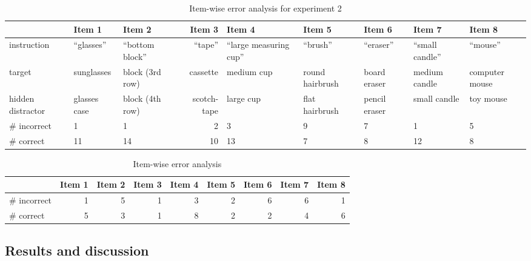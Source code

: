 \documentclass[10pt,letterpaper]{article}
\begin{document}
\begin{table}
\begin{center}
\begin{tabular}{ m{1.5cm} | m{1.5cm} | m{1.5cm} |  r | m{1.6cm} | m{1.4cm} | m{1.3cm} | m{1.3cm} | m{1.5cm} |}
& Item 1 & Item 2 & Item 3 & Item 4 & Item 5 & Item 6 & Item 7 & Item 8\\\hline
instruction & ``glasses'' & ``bottom block'' & ``tape'' & ``large measuring cup'' & ``brush'' & ``eraser'' & ``small candle'' & ``mouse'' \\\hline
target & sunglasses & block (3rd row) & cassette & medium cup & round hairbrush & board eraser & medium candle & computer mouse \\\hline
hidden distractor & glasses case & block (4th row) & scotch-tape & large cup & flat \,\,\,hairbrush & pencil eraser & small candle & toy mouse \\\hline
 \# incorrect & 1 & 1 & 2 & 3 & 9 & 7 & 1 & 5 \\
 \# correct   & 11&14&10&13&7 &8   &12& 8 \\
\end{tabular}
\caption{Item-wise error analysis for experiment 2}
\label{table:exp2ItemWise}
\end{center}
\end{table}

\begin{table}
\begin{center}
\begin{tabular}{ p{2cm} | r | r |  r | r | r | r | r | r |}
& Item 1 & Item 2 & Item 3 & Item 4 & Item 5 & Item 6 & Item 7 & Item 8\\\hline
\# incorrect & 1 & 5 & 1 & 3 & 2 &6 & 6 & 1 \\ 
\# correct & 5 & 3 & 1 & 8 & 2 & 2 & 4 & 6 \\
\end{tabular}
\caption{Item-wise error analysis}
\label{table:exp1ItemWise}
\end{center}
\end{table}

\subsection{Results and discussion}
\end{document}
